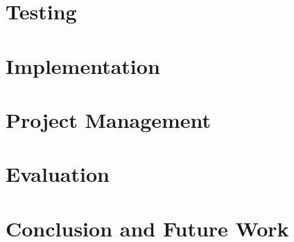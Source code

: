 \documentclass[12pt, a4paper, twoside]{book}
\begin{document}
\chapter{Testing}
\label{chp:testing}


\chapter{Implementation}
\label{chp:implementation}


\chapter{Project Management}
\label{chp:project_management}


\chapter{Evaluation}
\label{chp:evaluation}


\chapter{Conclusion and Future Work}
\label{chp:conclusions_further_work}


\pagestyle{empty}

\appendix


\backmatter

\printbibliography
{}
\end{document}
